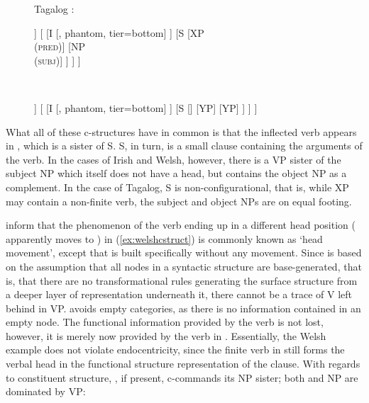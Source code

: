 \begin{figure}
\a Tagalog \citep[131]{kroeger1991}:\label{ex:tagalogcstruct}\medskip \\
\begin{minipage}[t]{.5\remaining}
\begin{forest}
[IP
	[SPEC
		[, phantom, tier=bottom]
	]
	[
		[I
			[, phantom, tier=bottom]
		]
		[S
			[{XP\\ (\textsc{pred})}]
			[{NP\\ (\textsc{subj})}]
		]
	]
]
\end{forest}
\end{minipage}
~
\begin{minipage}[t]{.5\remaining}
\begin{forest}
[IP
	[SPEC
		[, phantom, tier=bottom]
	]
	[
		[I
			[, phantom, tier=bottom]
		]
		[S
			[]
			[YP]
			[YP]
		]
	]
]
\end{forest}
\end{minipage}
\xe
\end{figure}

What all of these c-structures have in common is that the inflected verb
appears in , which is a sister of S. S, in turn, is a small clause
containing the arguments of the verb. In the cases of Irish and Welsh, however,
there is a VP sister of the subject NP which itself does not have a head, but
contains the object NP as a complement. In the case of Tagalog, S is
non-configurational, that is, while XP may contain a non-finite verb, the
subject and object NPs are on equal footing.

\citet[129--138]{bresnan2016} inform that the phenomenon of the verb ending up
in a different head position ( apparently moves to ) in
(\ref{ex:welshcstruct}) is commonly known as `head movement', except that
\Lfg{} is built specifically without any movement. Since \Lfg{} is based
on the assumption that all nodes in a syntactic structure are base-generated,
that is, that there are no transformational rules generating the surface
structure from a deeper layer of representation underneath it, there cannot be
a trace of V left behind in VP. \Lfg{} avoids empty categories, as there is no
information contained in an empty node. The functional information provided by
the verb is not lost, however, it is merely now provided by the verb in
. Essentially, the Welsh example does not violate endocentricity,
since the finite verb in  still forms the verbal head in the
functional structure representation of the clause. With regards to constituent
structure, , if present, c-commands its NP sister; both  and
NP are dominated by VP:

